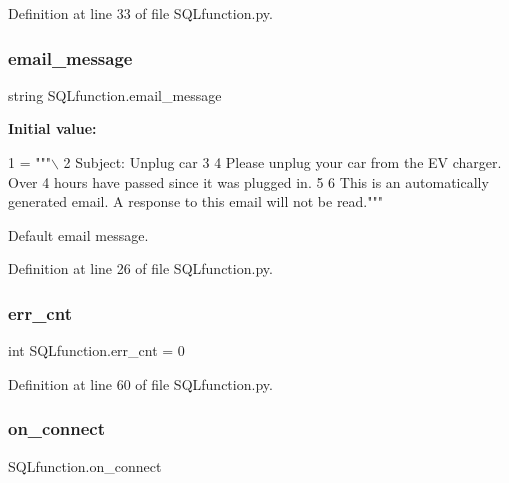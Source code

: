 Definition at line 33 of file S\+Q\+Lfunction.\+py.

\mbox{\label{namespace_s_q_lfunction_ae767f70baa76040d2b29bd6eeefd7bbe}} 
\subsubsection{\texorpdfstring{email\+\_\+message}{email\_message}}
{\footnotesize\ttfamily string S\+Q\+Lfunction.\+email\+\_\+message}

{\bfseries Initial value\+:}
\begin{DoxyCode}
1 =  \textcolor{stringliteral}{"""\(\backslash\)}
2 \textcolor{stringliteral}{Subject: Unplug car}
3 \textcolor{stringliteral}{}
4 \textcolor{stringliteral}{Please unplug your car from the EV charger. Over 4 hours have passed since it was plugged in.}
5 \textcolor{stringliteral}{}
6 \textcolor{stringliteral}{This is an automatically generated email. A response to this email will not be read."""}
\end{DoxyCode}


Default email message. 



Definition at line 26 of file S\+Q\+Lfunction.\+py.

\mbox{\label{namespace_s_q_lfunction_a5964aea00837148a0d731102edf6ac5c}} 
\subsubsection{\texorpdfstring{err\+\_\+cnt}{err\_cnt}}
{\footnotesize\ttfamily int S\+Q\+Lfunction.\+err\+\_\+cnt = 0}



Definition at line 60 of file S\+Q\+Lfunction.\+py.

\mbox{\label{namespace_s_q_lfunction_a215e7090f82fbf0d31fd97be6721389a}} 
\subsubsection{\texorpdfstring{on\+\_\+connect}{on\_connect}}
{\footnotesize\ttfamily S\+Q\+Lfunction.\+on\+\_\+connect}



